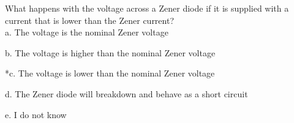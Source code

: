 
What happens with the voltage across a Zener diode if it is supplied with a current that is lower than the Zener current? \\

a. The voltage is the nominal Zener voltage

b. The voltage is higher than the nominal Zener voltage

*c. The voltage is lower than the nominal Zener voltage

d. The Zener diode will breakdown and behave as a short circuit

e. I do not know \\
